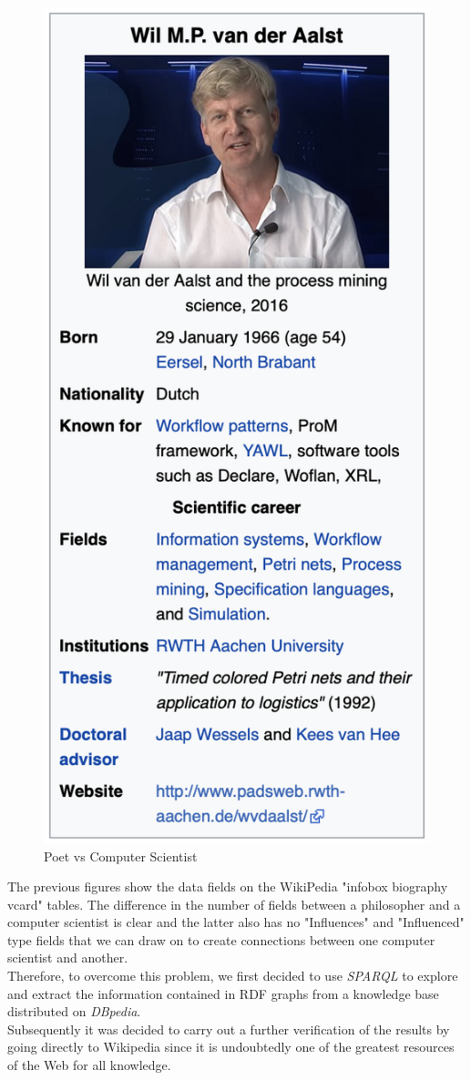 \documentclass[12pt, twoside]{article}
\begin{document}
\begin{figure}[htp]
\begin{minipage}[t]{0.5\linewidth}
\includegraphics[width = .5\textwidth]{images/van_der}
\end{minipage}
\caption{Poet vs Computer Scientist}
\end{figure}
\noindent
The previous figures show the data fields on the WikiPedia "infobox biography vcard" tables. The difference in the number of fields between a philosopher and a computer scientist is clear and the latter also has no "Influences" and "Influenced" type fields that we can draw on to create connections between one computer scientist and another. \\
Therefore, to overcome this problem, we first decided to use \textit{SPARQL} to explore and extract the information contained in RDF graphs from a knowledge base distributed on \textit{DBpedia}.\\
Subsequently it was decided to carry out a further verification of the results by going directly to Wikipedia since it is undoubtedly one of the greatest resources of the Web for all knowledge.
\newpage
\end{document}
